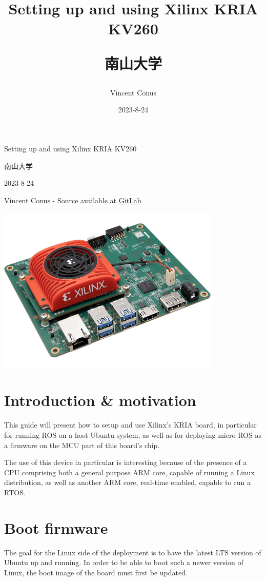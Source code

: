 \documentclass[10pt]{article}
\author{Vincent Conus}
\date{2023-8-24}
\title{Setting up and using Xilinx KRIA KV260\\\medskip
\large \begin{CJK}{UTF8}{min}南山大学\end{CJK}}
\newcommand{\gitlab}[1]{%
\href{#1}{GitLab \faGitlab}}
\begin{document}
\begin{titlepage}
\centering
{\LARGE Setting up and using Xilinx KRIA KV260 \par }
\vspace{5mm}
{\large \begin{CJK}{UTF8}{min}南山大学\end{CJK} \par}
\vspace{1cm}
{\large 2023-8-24 \par}
\vspace{2cm}
{\large Vincent Conus -  Source available at \gitlab{https://gitlab.com/sunoc/xilinx-kria-kv260-documentation} \par}
\vspace{3cm}
\includegraphics[width=0.8\textwidth]{./img/board}\end{titlepage}
\tableofcontents
\pagebreak
\section{Introduction \& motivation}
\label{sec:org9cfbe84}
This guide will present how to setup and use Xilinx's KRIA board, in particular
for running ROS on a host Ubuntu system, as well as for deploying
micro-ROS as a firmware on the MCU part of this board's chip.

The use of this device in particular is interesting because of the presence
of a CPU comprising both a general purpose ARM core, capable of running
a Linux distribution, as well as another ARM core, real-time enabled,
capable to run a RTOS.

\section{Boot firmware}
\label{sec:org736a5ba}
The goal for the Linux side of the deployment is to
have the latest LTS version of Ubuntu up and running.
In order to be able to boot such a newer version of Linux, the
boot image of the board must first be updated.
\end{document}
